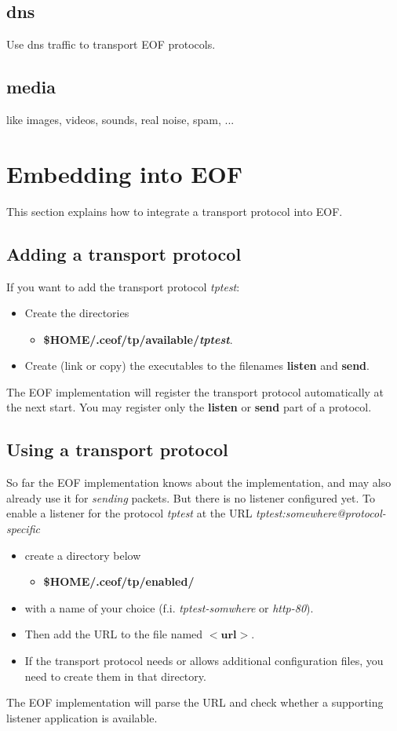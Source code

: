 \documentclass[12pt,a4paper]{book}
\begin{document}
{\subsection{dns}
Use dns traffic to transport EOF protocols.
\subsection{media}
like images, videos, sounds, real noise, spam, ...
\section{Embedding into EOF}
This section explains how to integrate a transport protocol into EOF.
\subsection{Adding a transport protocol}
If you want to add the transport protocol \emph{tptest}:
\begin{itemize}
\item Create the directories
\begin{itemize}
\item \textbf{\$HOME/.ceof/tp/available/\emph{tptest}}.
\end{itemize}
\item Create (link or copy) the executables to the filenames \textbf{listen}
and \textbf{send}.
\end{itemize}
The EOF implementation will register the transport protocol automatically
at the next start. You may register only the \textbf{listen} or
\textbf{send} part of a protocol.
\subsection{Using a transport protocol}
So far the EOF implementation knows about the implementation, and may also
already use it for \emph{sending} packets. But there is no listener configured
yet.
To enable a listener for the protocol \emph{tptest} at the URL
\emph{tptest:somewhere@protocol-specific}
\begin{itemize}
\item create a directory below
\begin{itemize}
\item \textbf{\$HOME/.ceof/tp/enabled/}
\end{itemize}
\item with a name of your choice (f.i. \emph{tptest-somwhere} or \emph{http-80}).
\item Then add the URL to the file named $<\textbf{url}>$.
\item If the transport protocol needs or allows additional configuration files,
you need to create them in that directory.
\end{itemize}
The EOF implementation will parse the URL and check whether a supporting
listener application is available.

}
\end{document}
